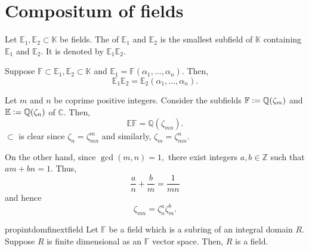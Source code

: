 \section{Compositum of fields}

\begin{defn}%
    Let $\mathbb{E}_1, \mathbb{E}_2 \subset \mathbb{K}$ be fields. The  of $\mathbb{E}_1$ and $\mathbb{E}_2$ is the smallest subfield of $\mathbb{K}$ containing $\mathbb{E}_1$ and $\mathbb{E}_2.$ It is denoted by $\mathbb{E}_1\mathbb{E}_2.$
\end{defn}

\begin{ex}
    Suppose $\mathbb{F} \subset \mathbb{E}_1, \mathbb{E}_2 \subset \mathbb{K}$ and $\mathbb{E}_1 = \mathbb{F}(\alpha_1, \ldots, \alpha_n).$ Then,
    \begin{equation*} 
        \mathbb{E}_1\mathbb{E}_2 = \mathbb{E}_2(\alpha_1, \ldots, \alpha_n).
    \end{equation*}
\end{ex}

\begin{ex} \label{ex:compositecyclo}
    Let $m$ and $n$ be coprime positive integers. Consider the subfields $\mathbb{F} \vcentcolon= \mathbb{Q}(\zeta_m)$ and $\mathbb{E} \vcentcolon= \mathbb{Q}(\zeta_n)$ of $\mathbb{C}.$ Then,
    \begin{equation*} 
        \mathbb{E}\mathbb{F} = \mathbb{Q}(\zeta_{mn}).
    \end{equation*}
    $\subset$ is clear since $\zeta_n = \zeta_{mn}^m$ and similarly, $\zeta_m = \zeta_{mn}^n.$

    On the other hand, since $\gcd(m, n) = 1,$ there exist integers $a, b \in \mathbb{Z}$ such that $am + bn = 1.$ Thus,
    \begin{equation*} 
        \frac{a}{n} + \frac{b}{m} = \frac{1}{mn}
    \end{equation*}
    and hence
    \begin{equation*} 
        \zeta_{mn} = \zeta_n^a\zeta_m^b.
    \end{equation*}
\end{ex}

\begin{restatable}[]{prop}{intdomfinextfield}
\label{prop:intdomfinextfield}
    Let $\mathbb{F}$ be a field which is a subring of an integral domain $R.$ Suppose $R$ is finite dimensional as an $\mathbb{F}$ vector space. Then, $R$ is a field. \hfill\hyperref[prop:intdomfinextfield2]{\downsym}
\end{restatable}

